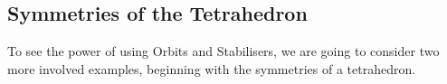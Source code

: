 \documentclass[a4]{scrreprt}
\begin{document}
\subsection{Symmetries of the Tetrahedron}

To see the power of using Orbits and Stabilisers, we are going to consider two more involved examples, beginning with the symmetries of a tetrahedron.

\begin{center}
	


\begin{tikzpicture}[x=0.75pt,y=0.75pt,yscale=-1,xscale=1]


\end{tikzpicture}
\end{center}
\end{document}
